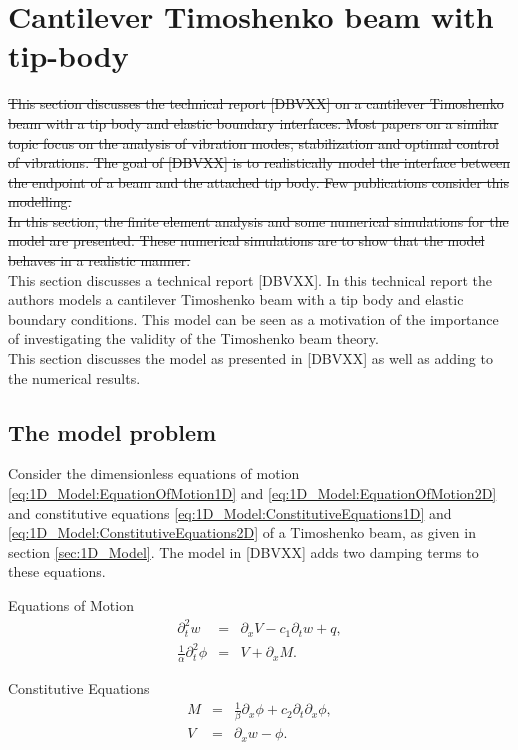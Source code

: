 \documentclass[../../main.tex]{subfiles}
\begin{document}
\noindent
\section{Cantilever Timoshenko beam with tip-body}
\sout{This section discusses the technical report [DBVXX] on a cantilever Timoshenko beam with a tip body and elastic boundary interfaces. Most papers on a similar topic focus on the analysis of vibration modes, stabilization and optimal control of vibrations. The goal of [DBVXX] is to realistically model the interface between the endpoint of a beam and the attached tip body. Few publications consider this modelling.}\\

\sout{In this section, the finite element analysis and some numerical simulations for the model are presented. These numerical simulations are to show that the model behaves in a realistic manner.}\\

This section discusses a technical report [DBVXX]. In this technical report the authors models a cantilever Timoshenko beam with a tip body and elastic boundary conditions. This model can be seen as a motivation of the importance of investigating the validity of the Timoshenko beam theory.\\

This section discusses the model as presented in [DBVXX] as well as adding to the numerical results.


\subsection{The model problem}
Consider the dimensionless equations of motion \ref{eq:1D_Model:EquationOfMotion1D} and \ref{eq:1D_Model:EquationOfMotion2D} and constitutive equations \ref{eq:1D_Model:ConstitutiveEquations1D} and \ref{eq:1D_Model:ConstitutiveEquations2D} of a Timoshenko beam, as given in section \ref{sec:1D_Model}. The model in [DBVXX] adds two damping terms to these equations.


{Equations of Motion}
\begin{eqnarray}
	\partial_t^2 w &=& \partial_x V - c_1\partial_t w  + q, \label{CT_1}\\
	\frac{1}{\alpha}\partial_t^2 \phi &=& V+\partial_xM. \label{CT_2}
\end{eqnarray}

\noindent
{Constitutive Equations}
\begin{eqnarray}
	M &=& \frac{1}{\beta}\partial_x \phi +c_2 \partial_t \partial_x \phi,\label{CT_3}\\
	V&=& \partial_x w - \phi.\label{CT_4}
\end{eqnarray}
\end{document}
